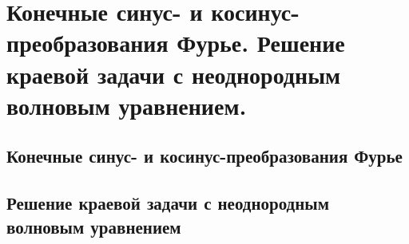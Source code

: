 \chapter{Конечные синус- и косинус-преобразования Фурье. Решение краевой задачи
с неоднородным волновым уравнением.}

\section{Конечные синус- и косинус-преобразования Фурье}
\section{Решение краевой задачи с неоднородным волновым уравнением}
\newpage

